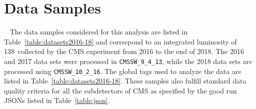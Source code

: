 \section{Data Samples}~\label{Data samples}
The data samples considered for this analysis are listed in Table~\ref{table:datasets2016-18} and correspond to an integrated luminosity of 138~\fbinv collected by the CMS experiment from 2016 to the end of 2018. The 2016 and 2017 data sets were processed in {\tt CMSSW\_9\_4\_13}, while the 2018 data sets are processed using {\tt CMSSW\_10\_2\_16}. The global tags used to analyze the data are listed in Table~\ref{table:datasets2016-18}. These samples also fulfill standard data quality criteria for all the subdetectors of CMS as specified by the good run JSONs listed in Table~\ref{table:json}. 

